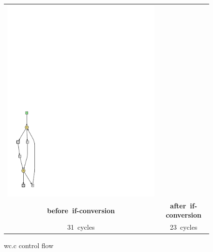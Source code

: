 \begin{figure}[h]
\begin{center}
\begin {tabular}{cc}
\includegraphics[scale=0.6]{graph7.pdf}
\\
\mbox{\bf before if-conversion} & \mbox{\bf after if-conversion}
\\
\mbox{31 cycles} & \mbox{23 cycles} 
\end{tabular} \)
\end{center}
\caption{wc.c control flow}
\label{fig:wc_cfg}
\end{figure}



